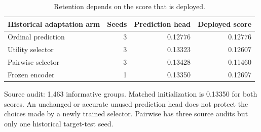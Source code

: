 \begin{table}[htbp]
\centering\small
\caption{Retention depends on the score that is deployed.}
\label{tab:heads}
\begin{tabular}{lrrr}
\toprule
Historical adaptation arm & Seeds & Prediction head & Deployed score \\
\midrule
Ordinal prediction & 3 & 0.12776 & 0.12776 \\
Utility selector & 3 & 0.13323 & 0.12607 \\
Pairwise selector & 3 & 0.13428 & 0.11460 \\
Frozen encoder & 1 & 0.13350 & 0.12697 \\
\bottomrule
\end{tabular}
\par\smallskip
\begin{minipage}{\linewidth}\footnotesize Source audit: 1,463 informative groups. Matched initialization is 0.13350 for both scores. An unchanged or accurate unused prediction head does not protect the choices made by a newly trained selector. Pairwise has three source audits but only one historical target-test seed.\end{minipage}
\end{table}
